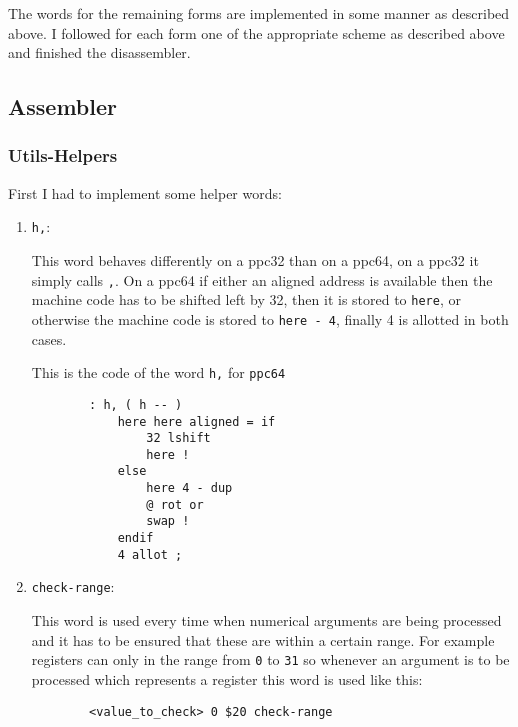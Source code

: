     The words for the remaining forms are implemented in some manner as
    described above. I followed for each form one of the appropriate scheme as
    described above and finished the disassembler.

    \subsection{Assembler}

    \subsubsection{Utils-Helpers}

    First I had to implement some helper words:

    \begin{enumerate}
        \item \texttt{h,}:
        
        This word behaves differently on a ppc32 than on a ppc64,
        on a ppc32 it simply calls \texttt{,}. On a ppc64 if either an aligned
        address is available then the machine code has to be shifted left by 32,
        then it is stored to \texttt{here}, or otherwise the machine code is
        stored to \texttt{here - 4}, finally 4 is allotted in both cases.

        \pagebreak
        This is the code of the word \texttt{h,} for \texttt{ppc64}

        \begin{verbatim}
        : h, ( h -- ) 
            here here aligned = if
                32 lshift
                here !
            else
                here 4 - dup
                @ rot or
                swap !
            endif
            4 allot ;
        \end{verbatim}

        \item \texttt{check-range}:

        This word is used every time when numerical arguments are being
        processed and it has to be ensured that these are within a certain
        range. For example registers can only in the range from \texttt{0} to
        \texttt{31} so whenever an argument is to be processed which represents
        a register this word is used like this:

        \begin{verbatim}
        <value_to_check> 0 $20 check-range
        \end{verbatim}


\end{enumerate}
